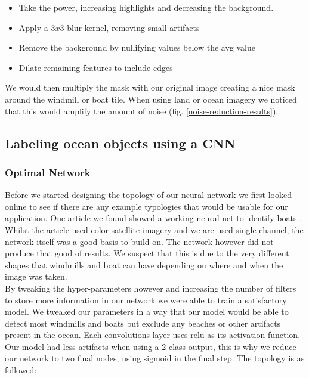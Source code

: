 \begin{itemize}
    \item Take the power, increasing highlights and decreasing the background.
    \item Apply a $3x3$ blur kernel, removing small artifacts
    \item Remove the background by nullifying values below the avg value
    \item Dilate remaining features to include edges
\end{itemize}

We would then multiply the mask with our original image creating a nice mask around the windmill or boat tile. When using land or ocean imagery we noticed that this would amplify the amount of noise (fig. \ref{noise-reduction-results}).

\subsection{Labeling ocean objects using a CNN}

\subsubsection{Optimal Network}

Before we started designing the topology of our neural network we first looked online to see if there are any example typologies that would be usable for our application. One article we found showed a working neural net to identify boats \cite{moraite_2019}. Whilst the article used color satellite imagery and we are used single channel, the network itself was a good basis to build on. The network however did not produce that good of results. We suspect that this is due to the very different shapes that windmills and boat can have depending on where and when the image was taken. \\

By tweaking the hyper-parameters however and increasing the number of filters to store more information in our network we were able to train a satisfactory model. We tweaked our parameters in a way that our model would be able to detect most windmills and boats but exclude any beaches or other artifacts present in the ocean. Each convolutions layer uses relu as its activation function. Our model had less artifacts when using a 2 class output, this is why we reduce our network to two final nodes, using sigmoid in the final step. The topology is as followed:

